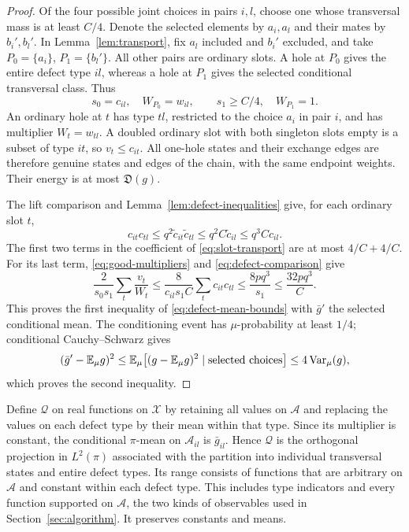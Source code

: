 \begin{proof}
Of the four possible joint choices in pairs $i,l$, choose one whose
transversal mass is at least $C/4$.
Denote the selected elements by $a_i,a_l$ and their mates by
$b_i',b_l'$.
In Lemma~\ref{lem:transport}, fix $a_l$ included and $b_i'$ excluded,
and take $P_0=\{a_i\}$, $P_1=\{b_l'\}$. All other pairs are ordinary
slots. A hole at $P_0$ gives the entire defect type $il$, whereas a
hole at $P_1$ gives the selected conditional transversal class.
Thus
\[
 s_0=c_{il},\quad W_{P_0}=w_{il},\qquad
 s_1\geq C/4,\quad W_{P_1}=1.
\]
An ordinary hole at $t$ has type $tl$, restricted to the choice $a_i$
in pair $i$, and has multiplier $W_t=w_{tl}$.
A doubled ordinary slot with both singleton slots empty is a subset
of type $it$, so $v_t\leq c_{it}$.
All one-hole states and their exchange edges are therefore genuine
states and edges of the chain, with the same endpoint weights.
Their energy is at most $\mathfrak D(g)$.

The lift comparison and Lemma~\ref{lem:defect-inequalities} give,
for each ordinary slot $t$,
\begin{equation}
 c_{it}c_{tl}
 \leq q^2\widetilde c_{it}\widetilde c_{tl}
 \leq q^2C\widetilde c_{il}
 \leq q^3C c_{il}.
 \label{eq:defect-comparison}
\end{equation}
The first two terms in the coefficient of
\eqref{eq:slot-transport} are at most $4/C+4/C$.
For its last term, \eqref{eq:good-multipliers} and
\eqref{eq:defect-comparison} give
\[
 \frac{2}{s_0s_1}\sum_t\frac{v_t}{W_t}
 \leq\frac{8}{c_{il}s_1C}\sum_t c_{it}c_{tl}
 \leq\frac{8pq^3}{s_1}
 \leq\frac{32pq^3}{C}.
\]
This proves the first inequality of
\eqref{eq:defect-mean-bounds} with $\bar g'$ the selected conditional
mean. The conditioning event has $\mu$-probability at least $1/4$;
conditional Cauchy--Schwarz gives
\[
 (\bar g'-\mathbb E_\mu g)^2
 \leq \mathbb E_\mu\bigl[(g-\mathbb E_\mu g)^2
                        \mid\text{selected choices}\bigr]
 \leq4\operatorname{Var}_\mu(g),
\]
which proves the second inequality.
\end{proof}

Define $\mathcal Q$ on real functions on $\mathcal X$ by retaining
all values on $\mathcal A$ and replacing the values on each defect
type by their mean within that type. Since its multiplier is
constant, the conditional $\pi$-mean on $\mathcal A_{il}$ is
$\bar g_{il}$. Hence $\mathcal Q$ is the orthogonal projection in
$L^2(\pi)$ associated with the partition into individual transversal
states and entire defect types. Its range consists of functions that
are arbitrary on $\mathcal A$ and constant within each defect type.
This includes type indicators and every function supported on
$\mathcal A$, the two kinds of observables used in
Section~\ref{sec:algorithm}. It preserves constants and means.

